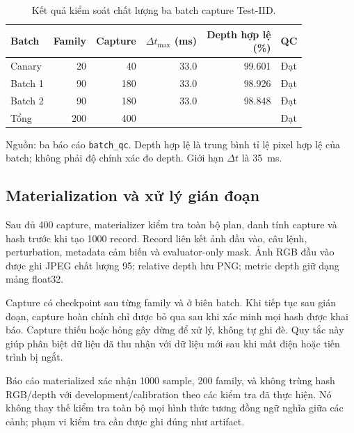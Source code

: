 \begin{table}[htbp]
    \centering
    \setlength{\tabcolsep}{4pt}
    \renewcommand{\arraystretch}{1.15}
    \caption{Kết quả kiểm soát chất lượng ba batch capture Test-IID.}
    \label{tab:setup-capture-qc}
    \small
    \begin{tabularx}{\textwidth}{@{}>{\raggedright\arraybackslash}Xrrrrc@{}}
        \toprule
        Batch & Family & Capture & \shortstack{$\Delta t_{\max}$\\(ms)} & \shortstack{Depth hợp lệ\\(\%)} & QC \\
        \midrule
        Canary & 20 & 40 & 33.0 & 99.601 & Đạt \\
        Batch 1 & 90 & 180 & 33.0 & 98.926 & Đạt \\
        Batch 2 & 90 & 180 & 33.0 & 98.848 & Đạt \\
        \midrule
        Tổng & 200 & 400 & & & Đạt \\
        \bottomrule
    \end{tabularx}
    \vspace{2pt}
    {\footnotesize\raggedright Nguồn: ba báo cáo \texttt{batch\_\allowbreak qc}.
    Depth hợp lệ là trung bình tỉ lệ pixel hợp lệ của batch;
    không phải độ chính xác đo depth. Giới hạn $\Delta t$ là 35~ms.\par}
\end{table}

\subsection{Materialization và xử lý gián đoạn}

Sau đủ 400 capture, materializer kiểm tra toàn bộ plan,
danh tính capture và hash trước khi tạo 1000 record.
Record liên kết ảnh đầu vào, câu lệnh, perturbation,
metadata cảm biến và evaluator-only mask.
Ảnh RGB đầu vào được ghi JPEG chất lượng 95; relative
depth lưu PNG; metric depth giữ dạng mảng float32.

Capture có checkpoint sau từng family và ở biên batch.
Khi tiếp tục sau gián đoạn, capture hoàn chỉnh chỉ được
bỏ qua sau khi xác minh mọi hash được khai báo. Capture
thiếu hoặc hỏng gây dừng để xử lý, không tự ghi đè.
Quy tắc này giúp phân biệt dữ liệu đã thu nhận với dữ
liệu mới sau khi mất điện hoặc tiến trình bị ngắt.

Báo cáo materialized xác nhận 1000 sample, 200 family,
và không trùng hash RGB/depth với development/calibration
theo các kiểm tra đã thực hiện. Nó không thay thế kiểm
tra toàn bộ mọi hình thức tương đồng ngữ nghĩa giữa
các cảnh; phạm vi kiểm tra cần được ghi đúng như artifact.

